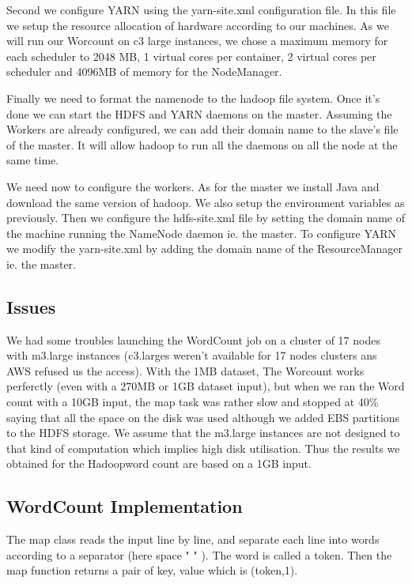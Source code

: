 \documentclass{article}
\begin{document}
Second we configure YARN using the yarn-site.xml configuration file. In this file we setup the resource allocation of hardware according to our machines. As we will run our Worcount on c3 large instances, we chose a maximum memory for each scheduler to 2048 MB, 1 virtual cores per container, 2 virtual cores per scheduler and 4096MB of memory for the NodeManager.

Finally we need to format the namenode to the hadoop file system. Once it’s done we can start the HDFS and YARN daemons on the master. Assuming the Workers are already configured, we can add their domain name to the slave’s file of the master. It will allow hadoop to run all the daemons on all the node at the same time.

We need now to configure the workers. As for the master we install Java and download the same version of hadoop. We also setup the environment variables as previously. Then we configure the hdfs-site.xml file by setting the domain name of the machine running the NameNode daemon ie. the master. To configure YARN we modify the yarn-site.xml by adding the domain name of the ResourceManager ie. the master.

\subsection{Issues}

We had some troubles launching the WordCount job on a cluster of 17 nodes with m3.large instances (c3.larges weren't available for 17 nodes clusters ans AWS refused us the access). With the 1MB dataset, The Worcount works perferctly (even with a 270MB or 1GB dataset input), but when we ran the Word count with a 10GB input, the map task was rather slow and stopped at 40\% saying that all the space on the disk was used although we added EBS partitions to the HDFS storage. We assume that the m3.large instances are not designed to that kind of computation which implies high disk utilisation. Thus the results we obtained for the Hadoopword count are based on a 1GB input.

\subsection{WordCount Implementation}

The map class reads the input line by line, and separate each line into words according to a separator (here space " " ). The word is called a token. Then the map function returns a pair of key, value which is (token,1).
\end{document}
